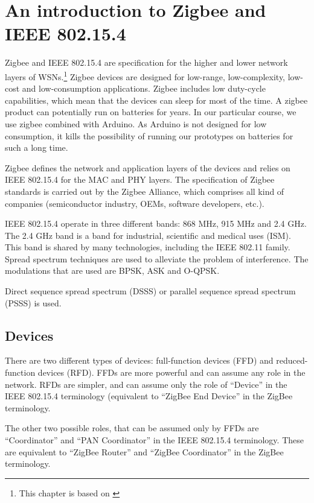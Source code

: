 \chapter{An introduction to Zigbee and IEEE 802.15.4}

Zigbee and IEEE 802.15.4 are specification for the higher and lower network layers of WSNs.\footnote{This chapter is based on \cite{farahani2008zwn}}
Zigbee devices are designed for low-range, low-complexity, low-cost and low-consumption applications.
Zigbee includes low duty-cycle capabilities, which mean that the devices can sleep for most of the time.
A zigbee product can potentially run on batteries for years.
In our particular course, we use zigbee combined with Arduino.
As Arduino is not designed for low consumption, it kills the possibility of running our prototypes on batteries for such a long time.

Zigbee defines the network and application layers of the devices and relies on IEEE 802.15.4 for the MAC and PHY layers.
The specification of Zigbee standards is carried out by the Zigbee Alliance, which comprises all kind of companies (semiconductor industry, OEMs, software developers, etc.).

IEEE 802.15.4 operate in three different bands: 868 MHz, 915 MHz and 2.4 GHz.
The 2.4 GHz band is a band for industrial, scientific and medical uses (ISM).
This band is shared by many technologies, including the IEEE 802.11 family.
Spread spectrum techniques are used to alleviate the problem of interference.
The modulations that are used are BPSK, ASK and O-QPSK.

Direct sequence spread spectrum (DSSS) or parallel sequence spread spectrum (PSSS) is used.

\section{Devices}

There are two different types of devices: full-function devices (FFD) and reduced-function devices (RFD).
FFDs are more powerful and can assume any role in the network.
RFDs are simpler, and can assume only the role of ``Device'' in the IEEE 802.15.4 terminology (equivalent to ``ZigBee End Device'' in the ZigBee terminology.

The other two possible roles, that can be assumed only by FFDs are ``Coordinator'' and ``PAN Coordinator'' in the IEEE 802.15.4 terminology.
These are equivalent to ``ZigBee Router'' and  ``ZigBee Coordinator'' in the ZigBee terminology.

